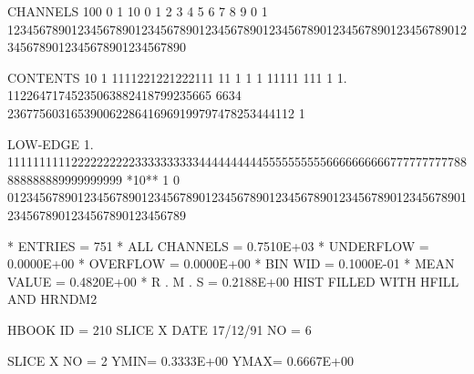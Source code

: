 \begin{Listing}
 CHANNELS 100   0                                                                                                  1   
           10   0        1         2         3         4         5         6         7         8         9         0   
            1   1234567890123456789012345678901234567890123456789012345678901234567890123456789012345678901234567890   
 
 CONTENTS  10                      1 1111221221222111 11                 1 1  1 11111  111   1                      
            1.              11226471745235063882418799235665 6634 236775603165390062286416969199797478253444112 1   
 
 LOW-EDGE   1.            111111111122222222223333333333444444444455555555556666666666777777777788888888889999999999
 *10**  1   0   0123456789012345678901234567890123456789012345678901234567890123456789012345678901234567890123456789
 
 * ENTRIES =        751      * ALL CHANNELS = 0.7510E+03      * UNDERFLOW = 0.0000E+00      * OVERFLOW = 0.0000E+00
 * BIN WID = 0.1000E-01      * MEAN VALUE   = 0.4820E+00      * R . M . S = 0.2188E+00
\newpage
 HIST FILLED WITH HFILL AND HRNDM2                                               
 
 HBOOK     ID =       210             SLICE X                    DATE  17/12/91              NO =   6
 
 SLICE X     NO =   2     YMIN=  0.3333E+00  YMAX=  0.6667E+00
 

\end{Listing}
